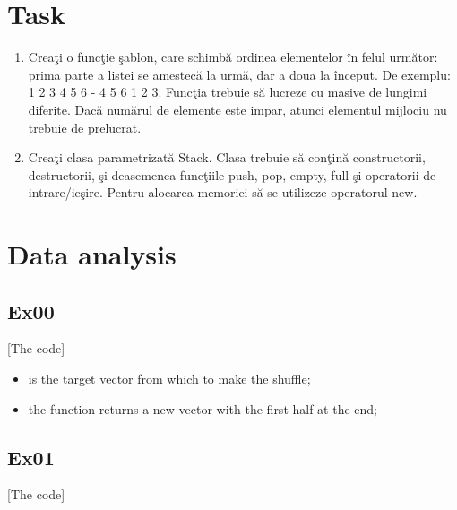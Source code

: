 \documentclass{article}
\begin{document}
	\section{Task}
		\begin{enumerate}
			\item Creaţi o funcţie şablon, care schimbă ordinea elementelor în felul următor: prima parte a listei se amestecă la urmă, dar a doua la început.  De exemplu:  1 2 3 4 5 6  -  4 5 6 1 2 3. Funcţia trebuie să lucreze cu masive de lungimi diferite. Dacă numărul de elemente este impar, atunci elementul mijlociu nu trebuie de prelucrat.

			\item Creaţi clasa parametrizată Stack. Clasa trebuie să conţină constructorii, destructorii, şi deasemenea funcţiile push, pop, empty, full şi operatorii de intrare/ieşire. Pentru alocarea memoriei să se utilizeze operatorul new.
		\end{enumerate}

	\section{Data analysis}
		\subsection{Ex00}

		\begin{center}
			[The code]
		\end{center}

		\begin{minipage}{\textwidth}
			\par {}
			\par {}
		\end{minipage}

		\begin{itemize}
			\item {} is the target vector from which to make the shuffle;
			\item the function returns a new vector with the first half at the end;
		\end{itemize}

		\subsection{Ex01}

		\begin{center}
			[The code]
		\end{center}
\end{document}

